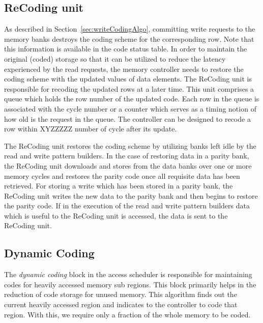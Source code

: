\subsection{ReCoding unit}
\label{sec:recoding}
As described in Section~\ref{sec:writeCodingAlgo}, committing write requests to the memory banks destroys the coding scheme for the corresponding row. Note that this information is available in the code status table. In order to maintain the original (coded) storage so that it can be utilized to reduce the latency experienced by the read requests, the memory controller needs to restore the coding scheme with the updated values of data elements.
The ReCoding unit is responsible for recoding the updated rows at a later time. This unit  comprises a queue which holds the row number of the updated code. Each row in the queue is associated with the cycle number or a counter which serves as a timing notion of how old is the request in the queue. The controller can be designed to recode a row within {\color{red}XYZZZZZ} number of cycle after its update. 

{\color{blue}The ReCoding unit restores the coding scheme by utilizing banks left idle by the read and write pattern builders. In the case of restoring data in a parity bank, the ReCoding unit downloads and stores from the data banks over one or more memory cycles and restores the parity code once all requisite data has been retrieved. For storing a write which has been stored in a parity bank, the ReCoding unit writes the new data to the parity bank and then begins to restore the parity code. If in the execution of the read and write pattern builders data which is useful to the ReCoding unit is accessed, the data is sent to the ReCoding unit.}


\subsection{Dynamic Coding}
\label{sec:dynamicCoding}
The {\em dynamic coding} block in the access scheduler is responsible for 
maintaining codes for heavily accessed memory sub regions. This block primarily 
helps in the reduction of code storage for unused memory. This algorithm finds 
out the current heavily accessed region and indicates to the controller to code 
that region. With this, we require only a fraction of the whole memory to be 
coded.  

